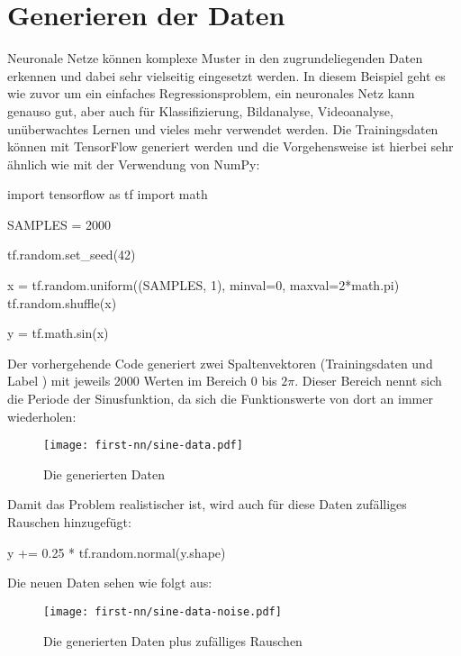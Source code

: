 \section{Generieren der Daten}
Neuronale Netze können komplexe Muster in den zugrundeliegenden Daten erkennen
und dabei sehr vielseitig eingesetzt werden.
In diesem Beispiel geht es wie zuvor um ein einfaches Regressionsproblem,
ein neuronales Netz kann genauso gut, aber auch für
Klassifizierung, Bildanalyse, Videoanalyse, unüberwachtes Lernen und vieles mehr verwendet werden.
Die Trainingsdaten können mit TensorFlow generiert werden und
die Vorgehensweise ist hierbei sehr ähnlich wie mit der Verwendung von NumPy:
\begin{pythoncode}
import tensorflow as tf
import math

SAMPLES = 2000

tf.random.set_seed(42)

x = tf.random.uniform((SAMPLES, 1), minval=0, maxval=2*math.pi)
tf.random.shuffle(x)

y = tf.math.sin(x)
\end{pythoncode}
Der vorhergehende Code generiert zwei Spaltenvektoren
(Trainingsdaten  und Label )
mit jeweils 2000 Werten im Bereich 0 bis $2\pi$.
Dieser Bereich nennt sich die Periode der Sinusfunktion,
da sich die Funktionswerte von dort an immer wiederholen:
\begin{figure}[!h]
  \centering
  \texttt{[image: first-nn/sine-data.pdf]}
  \caption{Die generierten Daten}
\end{figure}

\noindent
Damit das Problem realistischer ist, wird auch für diese Daten
zufälliges Rauschen hinzugefügt:
\begin{pythoncode}
y += 0.25 * tf.random.normal(y.shape)
\end{pythoncode}
Die neuen Daten sehen wie folgt aus:
\newpage
\begin{figure}[h!]
  \centering
  \texttt{[image: first-nn/sine-data-noise.pdf]}
  \caption{Die generierten Daten plus zufälliges Rauschen}
\end{figure}

